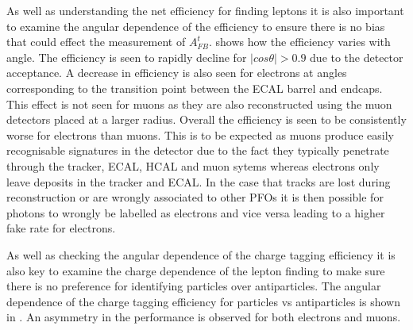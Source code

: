 As well as understanding the net efficiency for finding leptons it is also important to examine the angular dependence of the efficiency to ensure there is no bias that could effect the measurement of $A_{FB}^{t}$.  shows how the efficiency varies with angle. The efficiency is seen to rapidly decline for $|cos\theta| > 0.9$ due to the detector acceptance. A decrease in efficiency is also seen for electrons at angles corresponding to the transition point between the ECAL barrel and endcaps. This effect is not seen for muons as they are also reconstructed using the muon detectors placed at a larger radius. Overall the efficiency is seen to be consistently worse for electrons than muons. This is to be expected as muons produce easily recognisable signatures in the detector due to the fact they typically penetrate through the tracker, ECAL, HCAL and muon sytems whereas electrons only leave deposits in the tracker and ECAL. In the case that tracks are lost during reconstruction or are wrongly associated to other PFOs it is then possible for photons to wrongly be labelled as electrons and vice versa leading to a higher fake rate for electrons.

As well as checking the angular dependence of the charge tagging efficiency it is also key to examine the charge dependence of the lepton finding to make sure there is no preference for identifying particles over antiparticles. The angular dependence of the charge tagging efficiency for particles vs antiparticles is shown in . An asymmetry in the performance is observed for both electrons and muons.

